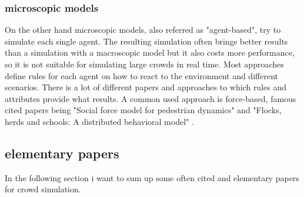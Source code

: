 \documentclass{acmsiggraph}               %
\begin{document}
\subsubsection{\textbf{microscopic models}} \label{def:microscopic models}
On the other hand microscopic models, also referred as "agent-based"\cite{xu_crowd_2014}, try to simulate each single agent. The resulting simulation often brings better results than a simulation with a macroscopic model but it also costs more performance, so it is not suitable for simulating large crowds in real time. Most approaches define rules for each agent on how to react to the environment and different scenarios. There is a lot of different papers and approaches to which rules and attributes provide what results. A common used approach is force-based, famous cited papers being "Social force model for pedestrian dynamics" \cite{helbing_social_1995} and "Flocks, herds and schools: A distributed behavioral model" \cite{reynolds_flocks_1987}. 

\subsection{elementary papers}
\label{chapter:elementaryPapers}
In the following section i want to sum up some often cited and elementary papers for crowd simulation. 
\end{document}
